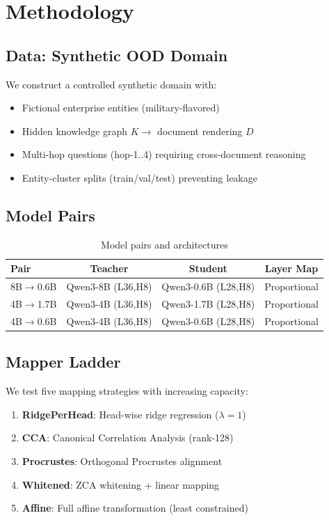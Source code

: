 \documentclass[11pt]{article}
\begin{document}
\section{Methodology}

\subsection{Data: Synthetic OOD Domain}

We construct a controlled synthetic domain with:
\begin{itemize}
    \item Fictional enterprise entities (military-flavored)
    \item Hidden knowledge graph $K \to$ document rendering $D$
    \item Multi-hop questions (hop-1..4) requiring cross-document reasoning
    \item Entity-cluster splits (train/val/test) preventing leakage
\end{itemize}

\subsection{Model Pairs}

\begin{table}[h]
\centering
\caption{Model pairs and architectures}
\begin{tabular}{lccc}
\toprule
Pair & Teacher & Student & Layer Map \\
\midrule
8B$\to$0.6B & Qwen3-8B (L36,H8) & Qwen3-0.6B (L28,H8) & Proportional \\
4B$\to$1.7B & Qwen3-4B (L36,H8) & Qwen3-1.7B (L28,H8) & Proportional \\
4B$\to$0.6B & Qwen3-4B (L36,H8) & Qwen3-0.6B (L28,H8) & Proportional \\
\bottomrule
\end{tabular}
\end{table}

\subsection{Mapper Ladder}

We test five mapping strategies with increasing capacity:
\begin{enumerate}
    \item \textbf{RidgePerHead}: Head-wise ridge regression ($\lambda=1$)
    \item \textbf{CCA}: Canonical Correlation Analysis (rank-128)
    \item \textbf{Procrustes}: Orthogonal Procrustes alignment
    \item \textbf{Whitened}: ZCA whitening + linear mapping
    \item \textbf{Affine}: Full affine transformation (least constrained)
\end{enumerate}
\end{document}
